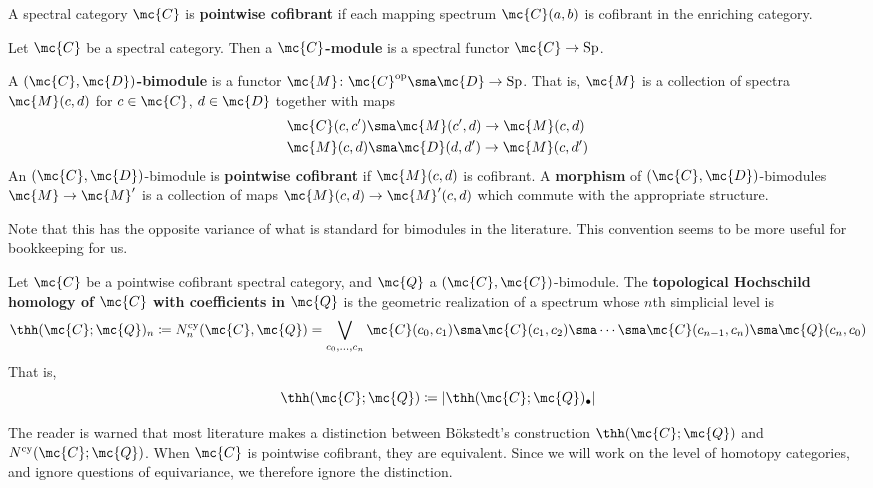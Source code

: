 \documentclass[11pt]{amsart}
\newcommand{\Sp}{\operatorname{Sp}}
\begin{document}
\begin{defn} 
	A spectral category $\mc{C}$ is \textbf{pointwise cofibrant} if each mapping spectrum $\mc{C}(a, b)$ is cofibrant in the enriching category.
\end{defn}

\begin{defn}
	Let $\mc{C}$ be a spectral category. Then a $\mc{C}$\textbf{-module} is a spectral functor $\mc{C} \to \Sp$. 
\end{defn}

\begin{defn}
  A \textbf{$(\mc{C}, \mc{D})$-bimodule} is a functor $\mc{M}\colon  \mc{C}^{\text{op}} \sma \mc{D} \to \Sp$. That is, $\mc{M}$ is a collection of spectra $\mc{M}(c, d)$ for $c \in \mc{C}$, $d \in \mc{D}$ together with maps
  \begin{align*}
    &\mc{C}(c, c') \sma \mc{M}(c', d) \to \mc{M}(c, d)\\
    &\mc{M}(c, d) \sma \mc{D}(d,d') \to \mc{M}(c, d') 
  \end{align*}
  An $(\mc{C}, \mc{D})$-bimodule is {\bf pointwise cofibrant} if $\mc{M}(c, d)$ is cofibrant. A {\bf morphism} of $(\mc{C}, \mc{D})$-bimodules $\mc{M} \to \mc{M}'$ is a collection of maps $\mc{M}(c, d) \to \mc{M}'(c, d)$ which commute with the appropriate structure. 
\end{defn}

\begin{rmk}
	Note that this has the opposite variance of what is standard for bimodules in the literature. This convention seems to be more useful for bookkeeping for us. 
\end{rmk}

\begin{defn}
  Let $\mc{C}$ be a pointwise cofibrant spectral category, and $\mc{Q}$ a $(\mc{C},\mc{C})$-bimodule. The \textbf{topological Hochschild homology of $\mc{C}$ with coefficients in $\mc{Q}$} is the geometric realization of a spectrum whose $n$th simplicial level is
  \[
  \thh(\mc{C}; \mc{Q})_n \coloneqq N^{\text{cy}}_n (\mc{C}, \mc{Q}) = \bigvee_{c_0, \dots, c_n} \mc{C}(c_0, c_1) \sma \mc{C}(c_1, c_2) \sma \cdots \sma \mc{C}(c_{n-1}, c_n) \sma \mc{Q}(c_n, c_0)
  \]
  That is, 
  \[
  \thh(\mc{C};\mc{Q}) \coloneqq \vert\thh(\mc{C};\mc{Q})_\bullet\vert
  \]
\end{defn}

\begin{rmk}
	The reader is warned that most literature makes a distinction between B\"{o}kstedt's construction $\thh(\mc{C};\mc{Q})$ and $N^{\text{cy}}(\mc{C};\mc{Q})$. When $\mc{C}$ is pointwise cofibrant, they are equivalent.  Since we will work on the level of homotopy categories, and ignore questions of equivariance, we therefore ignore the distinction. 
\end{rmk}
\end{document}
